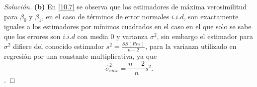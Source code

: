 \documentclass[10.5pt,notitlepage]{article}
\newenvironment{solucion}
  {\begin{proof}[Solución]}
  {\end{proof}}
\begin{document}
\begin{solucion}
\noindent \textbf{(b)} En \eqref{10.7} se observa que los estimadores de máxima verosimilitud para \(\beta_0\) y \(\beta_1\), en el caso de términos de error normales \(i.i.d\), son exactamente iguales a los estimadores por mínimos cuadrados en el caso en el que solo se sabe que los errores son \(i.i.d\) con media \(0\) y varianza \(\sigma^2\), sin embargo el estimador para \(\sigma^2\) difiere del conocido estimador \(s^2 =\frac{SS(Res)}{n-2}\), para la varianza utilizado en regresión por una constante multiplicativa, ya que
\[
\hat{\sigma}_{emv}^2 = \frac{n-2}{n}s^2.
\]. 
\end{solucion}
\end{document}
